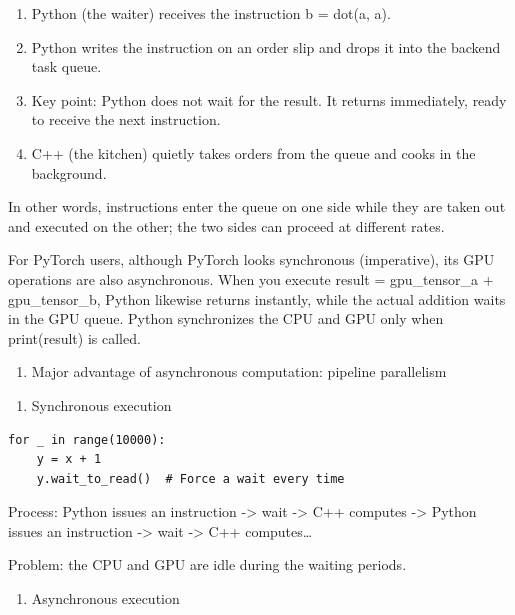 \begin{enumerate}
\def\labelenumi{(\arabic{enumi})}
\item
  Python (the waiter) receives the instruction b = dot(a, a).
\item
  Python writes the instruction on an order slip and drops it into the backend task queue.
\item
  Key point: Python does not wait for the result. It returns immediately, ready to receive the next instruction.
\item
  C++ (the kitchen) quietly takes orders from the queue and cooks in the background.
\end{enumerate}

In other words, instructions enter the queue on one side while they are taken out and executed on the other; the two sides can proceed at different rates.

For PyTorch users, although PyTorch looks synchronous (imperative), its GPU operations are also asynchronous. When you execute result = gpu\_tensor\_a + gpu\_tensor\_b, Python likewise returns instantly, while the actual addition waits in the GPU queue. Python synchronizes the CPU and GPU only when print(result) is called.

\begin{enumerate}
\def\labelenumi{\arabic{enumi}.}
\setcounter{enumi}{1}
\tightlist
\item
  Major advantage of asynchronous computation: pipeline parallelism
\end{enumerate}

\begin{enumerate}
\def\labelenumi{(\arabic{enumi})}
\tightlist
\item
  Synchronous execution
\end{enumerate}

\begin{verbatim}
for _ in range(10000):
    y = x + 1
    y.wait_to_read()  # Force a wait every time
\end{verbatim}

Process: Python issues an instruction -\textgreater{} wait -\textgreater{} C++ computes -\textgreater{} Python issues an instruction -\textgreater{} wait -\textgreater{} C++ computes\ldots{}

Problem: the CPU and GPU are idle during the waiting periods.

\begin{enumerate}
\def\labelenumi{(\arabic{enumi})}
\setcounter{enumi}{1}
\tightlist
\item
  Asynchronous execution
\end{enumerate}

